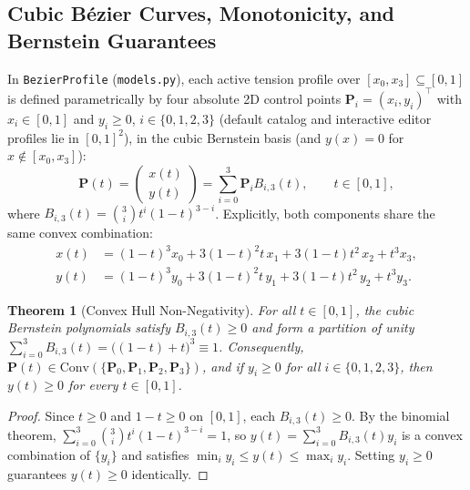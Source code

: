 \documentclass[10pt,twocolumn,letterpaper]{article}
\theoremstyle{plain}
\newtheorem{theorem}{Theorem}
\theoremstyle{definition}
\begin{document}
\subsection{Cubic B\'ezier Curves, Monotonicity, and Bernstein Guarantees}
In \texttt{BezierProfile} (\texttt{models.py}), each active tension profile over $[x_0, x_3] \subseteq [0, 1]$ is defined parametrically by four absolute 2D control points $\mathbf{P}_i = (x_i, y_i)^\top$ with $x_i \in [0, 1]$ and $y_i \ge 0$, $i \in \{0, 1, 2, 3\}$ (default catalog and interactive editor profiles lie in $[0, 1]^2$), in the cubic Bernstein basis (and $y(x) = 0$ for $x \notin [x_0, x_3]$):
\begin{equation}
  \mathbf{P}(t) = \begin{pmatrix} x(t) \\ y(t) \end{pmatrix} = \sum_{i=0}^{3} \mathbf{P}_i B_{i,3}(t), \qquad t \in [0, 1],
  \label{eq:bezier}
\end{equation}
where $B_{i,3}(t) = \binom{3}{i} t^i (1 - t)^{3-i}$. Explicitly, both components share the same convex combination:
\begin{align}
  x(t) &= (1-t)^3 x_0 + 3(1-t)^2 t\, x_1 + 3(1-t) t^2\, x_2 + t^3 x_3, \label{eq:bx} \\
  y(t) &= (1-t)^3 y_0 + 3(1-t)^2 t\, y_1 + 3(1-t) t^2\, y_2 + t^3 y_3. \label{eq:by}
\end{align}

\begin{theorem}[Convex Hull Non-Negativity]
For all $t \in [0, 1]$, the cubic Bernstein polynomials satisfy $B_{i,3}(t) \ge 0$ and form a partition of unity $\sum_{i=0}^{3} B_{i,3}(t) = \bigl((1-t) + t\bigr)^3 \equiv 1$. Consequently, $\mathbf{P}(t) \in \mathrm{Conv}(\{\mathbf{P}_0, \mathbf{P}_1, \mathbf{P}_2, \mathbf{P}_3\})$, and if $y_i \ge 0$ for all $i \in \{0, 1, 2, 3\}$, then $y(t) \ge 0$ for every $t \in [0, 1]$.
\end{theorem}

\begin{proof}
Since $t \ge 0$ and $1 - t \ge 0$ on $[0, 1]$, each $B_{i,3}(t) \ge 0$. By the binomial theorem, $\sum_{i=0}^3 \binom{3}{i} t^i (1-t)^{3-i} = 1$, so $y(t) = \sum_{i=0}^3 B_{i,3}(t) y_i$ is a convex combination of $\{y_i\}$ and satisfies $\min_i y_i \le y(t) \le \max_i y_i$. Setting $y_i \ge 0$ guarantees $y(t) \ge 0$ identically.
\end{proof}
\end{document}

